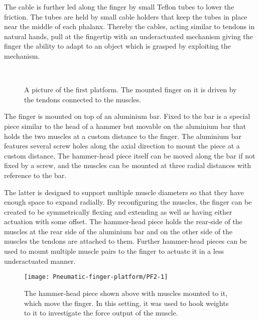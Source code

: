 \documentclass[main]{subfiles}
\begin{document}
The cable is further led along the finger by small Teflon tubes to lower the friction. The tubes are held by small cable holders that keep the tubes in place near the middle of each phalanx. Thereby the cables, acting similar to tendons in natural hands, pull at the fingertip with an underactuated mechanism giving the finger the ability to adapt to an object which is grasped by exploiting the mechanism.

\begin{figure}[H]
\centering
{}\hspace{0.1\textwidth}
\\
\caption[First platform]{A picture of the first platform. The mounted finger on it is driven by the tendons connected to the muscles.}
\label{antagonistic-muscles}
\end{figure}

The finger is mounted on top of an aluminium bar. Fixed to the bar is a special piece similar to the head of a hammer but movable on the aluminium bar that holds the two muscles at a custom distance to the finger. The aluminium bar features several screw holes along the axial direction to mount the piece at a custom distance. The hammer-head piece itself can be moved along the bar if not fixed by a screw, and the muscles can be mounted at three radial distances with reference to the bar.

The latter is designed to support multiple muscle diameters so that they have enough space to expand radially. By reconfiguring the muscles, the finger can be created to be symmetrically flexing and extending as well as having either actuation with some offset. The hammer-head piece holds the rear-side of the muscles at the rear side of the aluminium bar and on the other side of the muscles the tendons are attached to them. Further hammer-head pieces can be used to mount multiple muscle pairs to the finger to actuate it in a less underactuated manner. 
 
\begin{figure}[H]
\centering
\texttt{[image: Pneumatic-finger-platform/PF2-1]}
\caption[Hammer-head piece]{The hammer-head piece shown above with muscles mounted to it, which move the finger. In this setting, it was used to hook weights to it to investigate the force output of the muscle.}
\label{hammer-piece}
\end{figure}
\end{document}
